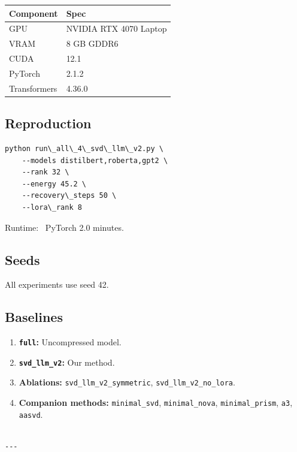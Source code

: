 \begin{table}[H]
\centering
\small
\begin{tabular}{ll}
\toprule
\textbf{Component} & \textbf{Spec} \\
\midrule
GPU & NVIDIA RTX 4070 Laptop \\
VRAM & 8 GB GDDR6 \\
CUDA & 12.1 \\
PyTorch & 2.1.2 \\
Transformers & 4.36.0 \\
\bottomrule
\end{tabular}
\end{table}

\subsection{Reproduction}

\begin{lstlisting}
python run\_all\_4\_svd\_llm\_v2.py \
    --models distilbert,roberta,gpt2 \
    --rank 32 \
    --energy 45.2 \
    --recovery\_steps 50 \
    --lora\_rank 8
\end{lstlisting}

Runtime: ~PyTorch 2.0 minutes.

\subsection{Seeds}

All experiments use seed 42.

\subsection{Baselines}

\begin{enumerate}
\item \textbf{\texttt{full}:} Uncompressed model.
\item \textbf{\texttt{svd\_llm\_v2}:} Our method.
\item \textbf{Ablations:} \texttt{svd\_llm\_v2\_symmetric}, \texttt{svd\_llm\_v2\_no\_lora}.
\item \textbf{Companion methods:} \texttt{minimal\_svd}, \texttt{minimal\_nova}, \texttt{minimal\_prism}, \texttt{a3}, \texttt{aasvd}.
\end{enumerate}
\begin{lstlisting}

---
\end{lstlisting}

